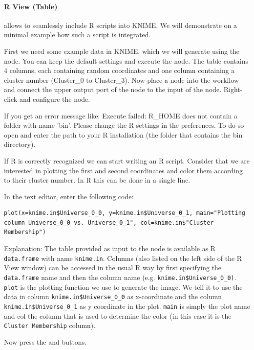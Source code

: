 \paragraph{R View (Table)} allows to seamlessly include R scripts into KNIME. We will demonstrate on a minimal example how such a script is integrated.

\begin{task}
First we need some example data in KNIME, which we will generate using the  node. You can keep the default settings and execute the node. The table contains 4 columns, each containing random coordinates and one column containing a cluster number (Cluster\_0 to Cluster\_3). Now place a  node into the workflow and connect the upper output port of the  node to the input of the  node.
Right-click and configure the node.

If you get an error message like: Execute failed: R\_HOME does not contain a folder with name 'bin'. Please change the R settings in the preferences. To do so open  and enter the path to your R installation (the folder that contains the bin directory).

If R is correctly recognized we can start writing an R script. Consider that we are interested in plotting the first and second coordinates and color them according to their cluster number. In R this can be done in a single line.

In the  text editor, enter the following code:
\begin{lstlisting}
plot(x=knime.in$Universe_0_0, y=knime.in$Universe_0_1, main="Plotting column Universe_0_0 vs. Universe_0_1", col=knime.in$"Cluster Membership")
\end{lstlisting}
        
Explanation:
The table provided as input to the  node is available as R \texttt{data.frame} with name \texttt{knime.in}. Columns (also listed on the left side of the R View window) can be accessed in the usual R way by first specifying the \texttt{data.frame} name and then the column name (e.g. \texttt{knime.in\$Universe\_0\_0)}.
\texttt{plot} is the plotting function we use to generate the image. We tell it to use the data in column \texttt{knime.in\$Universe\_0\_0} as x-coordinate and the column \texttt{knime.in\$Universe\_0\_1} as y coordinate in the plot. \texttt{main} is simply the plot name and col the column that is used to determine the color (in this case it is the \texttt{Cluster Membership} column).

Now press the  and  buttons.
\end{task}

